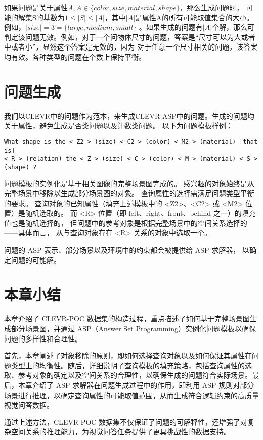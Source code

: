 如果问题是关于属性$A, A \in \{ color, size, material, shape\}$，那么生成问题时，
可能的解集S的基数为$1 \leq |S| \leq |A|$，其中$|A|$是属性A的所有可能取值集合的大小。例如，$|size| = 3 =\{ large, medium, small\}$
。如果生成的问题有$|A|$个解，那么可判定该问题无效。例如，对于一个问物体尺寸的问题，答案是“尺寸可以为大或者中或者小”，显然这个答案是无效的，因为
对于任意一个尺寸相关的问题，该答案均有效。各种类型的问题在个数上保持平衡。
\section{问题生成}
我们以CLEVR中的问题作为范本，来生成CLEVR-ASP中的问题。生成的问题均关于属性，避免生成是否类问题以及计数类问题。
以下为问题模板样例：
\begin{lstlisting}
What shape is the < Z2 > (size) < C2 > (color) < M2 > (material) [that is] 
< R > (relation) the < Z > (size) < C > (color) < M > (material) < S > (shape) ?
\end{lstlisting}

问题模板的实例化是基于相关图像的完整场景图完成的。
感兴趣的对象始终是从完整场景中移除以生成部分场景图的对象。
查询属性的选择需满足问题类型平衡的要求。
查询对象的已知属性（填充上述模板中的 <Z2>、<C2> 或 <M2> 位置）是随机选取的。
而 <R> 位置（即 left、right、front、behind 之一）的填充值也是随机选择的，
但问题中的参考对象是根据完整场景中的空间关系选择的——具体而言，
从与查询对象存在 <R> 关系的对象中选取一个。

问题的 ASP 表示、部分场景以及环境中的约束都会被提供给 ASP 求解器，
以确定问题的可能解。
\section{本章小结}
本章介绍了 CLEVR-POC 数据集的构造过程，重点描述了如何基于完整场景图生成部分场景图，并通过 ASP（Answer Set Programming）实例化问题模板以确保问题的多样性和合理性。

首先，本章阐述了对象移除的原则，即如何选择查询对象以及如何保证其属性在问题类型上的均衡性。随后，详细说明了查询模板的填充策略，包括查询属性的选取、参考对象的确定以及空间关系的合理性，以确保生成的问题符合实际场景。最后，本章介绍了 ASP 求解器在问题生成过程中的作用，即利用 ASP 规则对部分场景进行推理，以确定查询属性的可能取值范围，从而生成符合逻辑约束的高质量视觉问答数据。

通过上述方法，CLEVR-POC 数据集不仅保证了问题的可解释性，还增强了对复杂空间关系的推理能力，为视觉问答任务提供了更具挑战性的数据支持。
